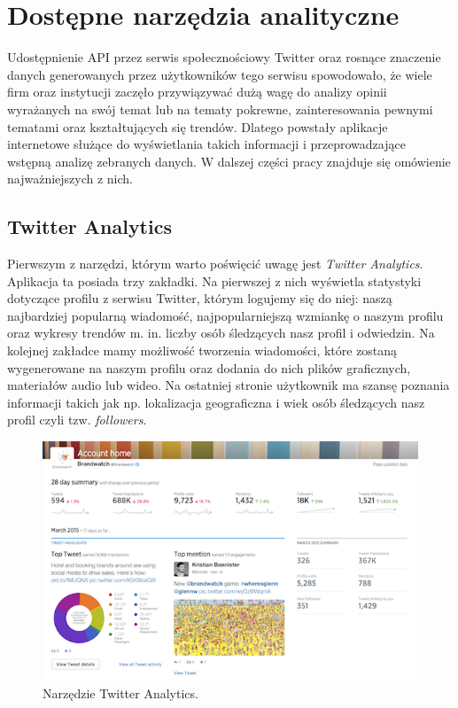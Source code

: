 \section{Dostępne narzędzia analityczne}
Udostępnienie API przez serwis społecznościowy Twitter oraz rosnące znaczenie danych generowanych przez użytkowników tego serwisu spowodowało, że wiele firm oraz instytucji zaczęło przywiązywać dużą wagę do analizy opinii wyrażanych na swój temat lub na tematy pokrewne, zainteresowania pewnymi tematami oraz kształtujących się trendów. Dlatego powstały aplikacje internetowe służące do wyświetlania takich informacji i przeprowadzające wstępną analizę zebranych danych. W dalszej części pracy znajduje się omówienie najważniejszych z nich.

\subsection{Twitter Analytics}

Pierwszym z narzędzi, którym warto poświęcić uwagę jest \textit{Twitter Analytics}. Aplikacja ta posiada trzy zakładki. Na pierwszej z nich wyświetla statystyki dotyczące profilu z serwisu Twitter, którym logujemy się do niej: naszą najbardziej popularną wiadomość, najpopularniejszą wzmiankę o naszym profilu oraz wykresy trendów m. in. liczby osób śledzących nasz profil i odwiedzin. Na kolejnej zakładce mamy możliwość tworzenia wiadomości, które zostaną wygenerowane na naszym profilu oraz dodania do nich plików graficznych, materiałów audio lub wideo. Na ostatniej stronie użytkownik ma szansę poznania informacji takich jak np. lokalizacja geograficzna i wiek osób śledzących nasz profil czyli tzw. \textit{followers}.

\begin{figure}[h] %
	\centering
	\includegraphics[width=0.8\linewidth]{img/twitter_tool_twitter_analytics}
	\caption{Narzędzie Twitter Analytics.}
\end{figure}

